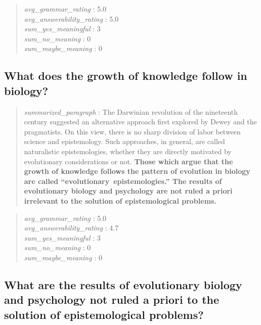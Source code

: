 \begin{quote}
\emph{avg\_grammar\_rating} : 5.0\\
\emph{avg\_answerability\_rating} : 5.0\\
\emph{sum\_yes\_meaningful} : 3\\
\emph{sum\_no\_meaning} : 0\\
\emph{sum\_maybe\_meaning} : 0
\end{quote}

\hypertarget{what-does-the-growth-of-knowledge-follow-in-biology}{%
\subsection{What does the growth of knowledge follow in
biology?}\label{what-does-the-growth-of-knowledge-follow-in-biology}}

\begin{quote}
\emph{summarized\_paragraph} : The Darwinian revolution of the
nineteenth century suggested an alternative approach first explored by
Dewey and the pragmatists. On this view, there is no sharp division of
labor between science and epistemology. Such approaches, in general, are
called naturalistic epistemologies, whether they are directly motivated
by evolutionary considerations or not. \textbf{Those which argue that
the growth of knowledge follows the pattern of evolution in biology are
called ``evolutionary~epistemologies.'' The results of evolutionary
biology and psychology are not ruled a priori irrelevant to the solution
of epistemological problems.}
\end{quote}

\begin{quote}
\emph{avg\_grammar\_rating} : 5.0\\
\emph{avg\_answerability\_rating} : 4.7\\
\emph{sum\_yes\_meaningful} : 3\\
\emph{sum\_no\_meaning} : 0\\
\emph{sum\_maybe\_meaning} : 0
\end{quote}

\hypertarget{what-are-the-results-of-evolutionary-biology-and-psychology-not-ruled-a-priori-to-the-solution-of-epistemological-problems}{%
\subsection{What are the results of evolutionary biology and psychology
not ruled a priori to the solution of epistemological
problems?}\label{what-are-the-results-of-evolutionary-biology-and-psychology-not-ruled-a-priori-to-the-solution-of-epistemological-problems}}

